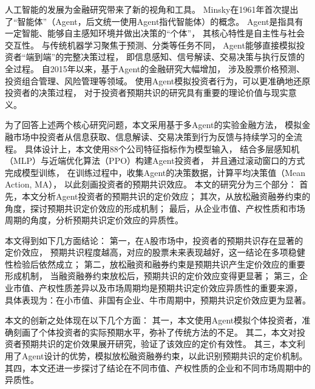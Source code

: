 人工智能的发展为金融研究带来了新的视角和工具。
Minsky在1961年首次提出了“智能体”（Agent，后文统一使用Agent指代智能体）的概念\cite{minsky1961steps}。
Agent是指具有一定智能、能够自主感知环境并做出决策的“个体”，
其核心特性是自主性与社会交互性。
与传统机器学习聚焦于预测、分类等任务不同，
Agent能够直接模拟投资者“端到端”的完整决策过程，
即信息感知、信号解读、交易决策与执行反馈的全过程\cite{turgut2023framework}。
自2015年以来，基于Agent的金融研究大幅增加，
涉及股票价格预测、投资组合管理、风险管理等领域\cite{ahmed2022artificial}。
使用Agent模拟投资者行为，可以更准确地还原投资者的决策过程，
对于投资者预期共识的研究具有重要的理论价值与现实意义。   

为了回答上述两个核心研究问题，本文采用基于多Agent的实验金融方法，
模拟金融市场中投资者从信息获取、信息解读、交易决策到行为反馈与持续学习的全流程。
具体设计上，本文使用88个公司特征指标作为模型输入，
结合多层感知机（MLP）与近端优化算法（PPO）构建Agent投资者，
并且通过滚动窗口的方式完成模型训练，
在训练过程中，收集Agent的决策数据，计算平均决策值（Mean Action, MA），
以此刻画投资者的预期共识效应。
本文的研究分为三个部分：
首先，本文分析Agent投资者的预期共识的定价效应；
其次，从放松融资融券约束的角度，探讨预期共识定价效应的形成机制；
最后，从企业市值、产权性质和市场周期的角度，分析预期共识定价效应的异质性。

本文得到如下几方面结论：
第一，在A股市场中，投资者的预期共识存在显著的定价效应，
预期共识程度越高，对应的股票未来表现越好，这一结论在多项稳健性检验后依然成立；
第二，放松融资和融券约束是预期共识产生定价效应的重要形成机制，
当融资融券约束放松后，预期共识的定价效应变得更显著；
第三，企业市值、产权性质差异以及市场周期均是预期共识定价效应异质性的重要来源，
具体表现为：在小市值、非国有企业、牛市周期中，预期共识定价效应更为显著。

本文的创新之处体现在以下几个方面：
其一，本文使用Agent模拟个体投资者，准确刻画了个体投资者的实际预期水平，弥补了传统方法的不足。
其二，本文对投资者预期共识的定价效果展开研究，验证了该效应的定价有效性。
其三，本文利用了Agent设计的优势，模拟放松融资融券约束，以此识别预期共识的定价机制。
其四，本文还进一步探讨了结论在不同市值、产权性质的企业和不同市场周期中的异质性。



